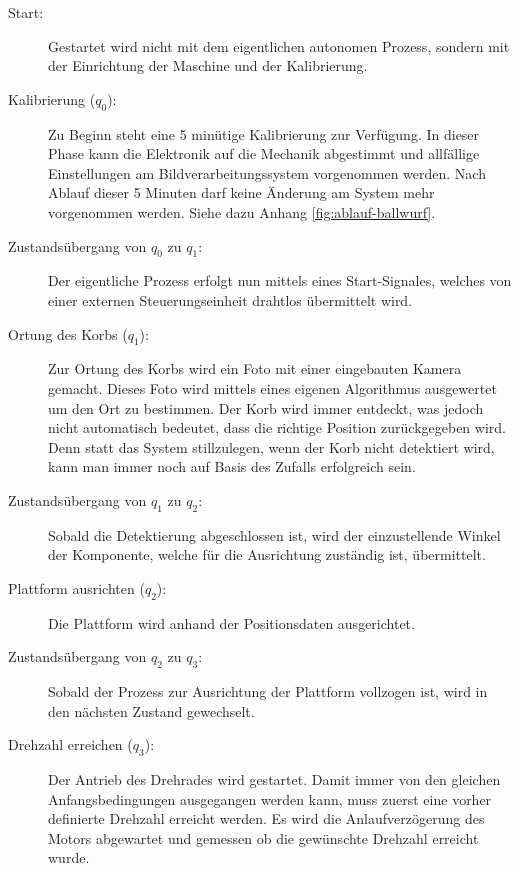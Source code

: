 \begin{description}
	
	\item[Start:] Gestartet wird nicht mit dem eigentlichen autonomen Prozess, sondern mit der Einrichtung der Maschine und der Kalibrierung.
	
	\item[Kalibrierung ($q_{0}$):] Zu Beginn steht eine 5 minütige Kalibrierung zur Verfügung. In dieser Phase kann die Elektronik auf die Mechanik abgestimmt und allfällige Einstellungen am Bildverarbeitungssystem vorgenommen werden. Nach Ablauf dieser 5 Minuten darf keine Änderung am System mehr vorgenommen werden. Siehe dazu Anhang \ref{fig:ablauf-ballwurf}.
	
	\item[Zustandsübergang von $q_{0}$ zu $q_{1}$:] Der eigentliche Prozess erfolgt nun mittels eines Start-Signales, welches von einer externen Steuerungseinheit drahtlos übermittelt wird.
	
	\item[Ortung des Korbs ($q_{1}$):] Zur Ortung des Korbs wird ein Foto mit einer eingebauten Kamera gemacht. Dieses Foto wird mittels eines eigenen Algorithmus ausgewertet um den Ort zu bestimmen. Der Korb wird immer entdeckt, was jedoch nicht automatisch bedeutet, dass die richtige Position zurückgegeben wird. Denn statt das System stillzulegen, wenn der Korb nicht detektiert wird, kann man immer noch auf Basis des Zufalls erfolgreich sein.
	
	\item[Zustandsübergang von $q_{1}$ zu $q_{2}$:]	Sobald die Detektierung abgeschlossen ist, wird der einzustellende Winkel der Komponente, welche für die Ausrichtung zuständig ist, übermittelt.
	
	\item[Plattform ausrichten ($q_{2}$):] Die Plattform wird anhand der Positionsdaten ausgerichtet.
	
	\item[Zustandsübergang von $q_{2}$ zu $q_{3}$:] Sobald der Prozess zur Ausrichtung der Plattform vollzogen ist, wird in den nächsten Zustand gewechselt.
	
	\item[Drehzahl erreichen ($q_{3}$):] Der Antrieb des Drehrades wird gestartet. Damit immer von den gleichen Anfangsbedingungen ausgegangen werden kann, muss zuerst eine vorher definierte Drehzahl erreicht werden. Es wird die Anlaufverzögerung des Motors abgewartet und gemessen ob die gewünschte Drehzahl erreicht wurde.
	

\end{description}

